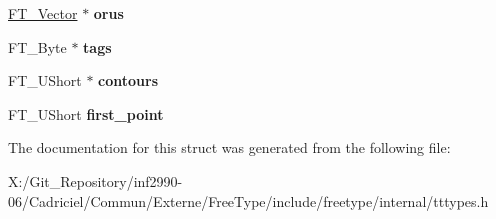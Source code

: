 \begin{DoxyCompactItemize}
\item 
\hypertarget{struct_t_t___glyph_zone_rec___a4b4193dbae177435cb6515f9a0537fa0}{\hyperlink{struct_f_t___vector__}{F\-T\-\_\-\-Vector} $\ast$ {\bfseries orus}}\label{struct_t_t___glyph_zone_rec___a4b4193dbae177435cb6515f9a0537fa0}

\item 
\hypertarget{struct_t_t___glyph_zone_rec___ae816c5c1096e333741d3f3f9d3ae0a8f}{F\-T\-\_\-\-Byte $\ast$ {\bfseries tags}}\label{struct_t_t___glyph_zone_rec___ae816c5c1096e333741d3f3f9d3ae0a8f}

\item 
\hypertarget{struct_t_t___glyph_zone_rec___ad16498cac0d4d233dce009eb74d63de1}{F\-T\-\_\-\-U\-Short $\ast$ {\bfseries contours}}\label{struct_t_t___glyph_zone_rec___ad16498cac0d4d233dce009eb74d63de1}

\item 
\hypertarget{struct_t_t___glyph_zone_rec___a9d655be80b3e31652f69ede54458faaf}{F\-T\-\_\-\-U\-Short {\bfseries first\-\_\-point}}\label{struct_t_t___glyph_zone_rec___a9d655be80b3e31652f69ede54458faaf}

\end{DoxyCompactItemize}


The documentation for this struct was generated from the following file\-:\begin{DoxyCompactItemize}
\item 
X\-:/\-Git\-\_\-\-Repository/inf2990-\/06/\-Cadriciel/\-Commun/\-Externe/\-Free\-Type/include/freetype/internal/tttypes.\-h\end{DoxyCompactItemize}
